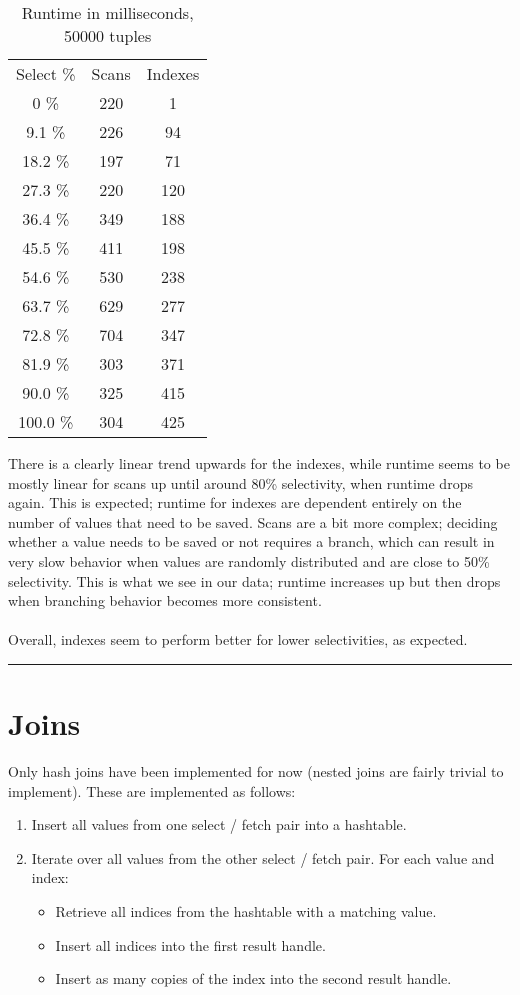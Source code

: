 \documentclass[paper=letter, fontsize=11pt]{scrartcl}
\numberwithin{equation}{section}
\numberwithin{figure}{section}
\numberwithin{table}{section}
\newcommand{\horrule}[1]{\rule{\linewidth}{#1}}
\begin{document}
\begin{table}[h!]
\centering
\begin{tabular}{c | c | c}
Select \% & Scans & Indexes \\
0 \% & 220 & 1 \\
9.1 \% & 226 & 94 \\
18.2 \% & 197 & 71 \\
27.3 \% & 220 & 120 \\
36.4 \% & 349 & 188 \\
45.5 \% & 411 & 198 \\
54.6 \% & 530 & 238 \\
63.7 \% & 629 & 277 \\
72.8 \% & 704 & 347 \\
81.9 \% & 303 & 371 \\
90.0 \% & 325 & 415 \\
100.0 \% & 304 & 425
\end{tabular}
\caption{Runtime in milliseconds, 50000 tuples}
\end{table}


There is a clearly linear trend upwards for the indexes, while runtime seems to be mostly linear for scans up until around 80\% selectivity, when runtime drops again.  This is expected; runtime for indexes are dependent entirely on the number of values that need to be saved.  Scans are a bit more complex; deciding whether a value needs to be saved or not requires a branch, which can result in very slow behavior when values are randomly distributed and are close to 50\% selectivity.  This is what we see in our data; runtime increases up but then drops when branching behavior becomes more consistent.
\\\\Overall, indexes seem to perform better for lower selectivities, as expected.

\horrule{0.5pt}
\section{Joins}
Only hash joins have been implemented for now (nested joins are fairly trivial to implement).  These are implemented as follows: 
\begin{enumerate}
\item Insert all values from one select / fetch pair into a hashtable.
\item Iterate over all values from the other select / fetch pair.  For each value and index:
	\begin{itemize}
	\item Retrieve all indices from the hashtable with a matching value.
	\item Insert all indices into the first result handle.
	\item Insert as many copies of the index into the second result handle.
	\end{itemize}
\end{enumerate}
\end{document}
